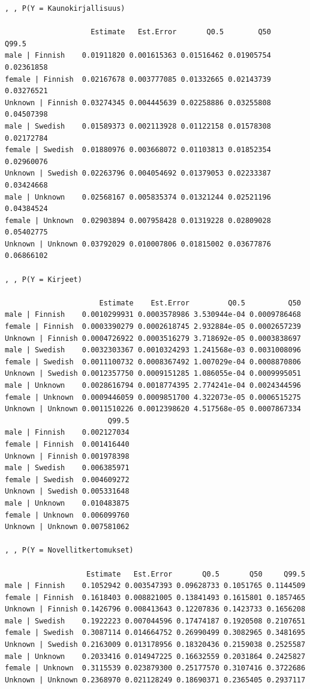 \documentclass[
  letterpaper,
  DIV=11,
  numbers=noendperiod]{scrartcl}
\begin{document}
\begin{verbatim}
, , P(Y = Kaunokirjallisuus)

                    Estimate   Est.Error       Q0.5        Q50      Q99.5
male | Finnish    0.01911820 0.001615363 0.01516462 0.01905754 0.02361858
female | Finnish  0.02167678 0.003777085 0.01332665 0.02143739 0.03276521
Unknown | Finnish 0.03274345 0.004445639 0.02258886 0.03255808 0.04507398
male | Swedish    0.01589373 0.002113928 0.01122158 0.01578308 0.02172784
female | Swedish  0.01880976 0.003668072 0.01103813 0.01852354 0.02960076
Unknown | Swedish 0.02263796 0.004054692 0.01379053 0.02233387 0.03424668
male | Unknown    0.02568167 0.005835374 0.01321244 0.02521196 0.04384524
female | Unknown  0.02903894 0.007958428 0.01319228 0.02809028 0.05402775
Unknown | Unknown 0.03792029 0.010007806 0.01815002 0.03677876 0.06866102

, , P(Y = Kirjeet)

                      Estimate    Est.Error         Q0.5          Q50
male | Finnish    0.0010299931 0.0003578986 3.530944e-04 0.0009786468
female | Finnish  0.0003390279 0.0002618745 2.932884e-05 0.0002657239
Unknown | Finnish 0.0004726922 0.0003516279 3.718692e-05 0.0003838697
male | Swedish    0.0032303367 0.0010324293 1.241568e-03 0.0031008096
female | Swedish  0.0011100732 0.0008367492 1.007029e-04 0.0008870806
Unknown | Swedish 0.0012357750 0.0009151285 1.086055e-04 0.0009995051
male | Unknown    0.0028616794 0.0018774395 2.774241e-04 0.0024344596
female | Unknown  0.0009446059 0.0009851700 4.322073e-05 0.0006515275
Unknown | Unknown 0.0011510226 0.0012398620 4.517568e-05 0.0007867334
                        Q99.5
male | Finnish    0.002127034
female | Finnish  0.001416440
Unknown | Finnish 0.001978398
male | Swedish    0.006385971
female | Swedish  0.004609272
Unknown | Swedish 0.005331648
male | Unknown    0.010483875
female | Unknown  0.006099760
Unknown | Unknown 0.007581062

, , P(Y = Novellitkertomukset)

                   Estimate   Est.Error       Q0.5       Q50     Q99.5
male | Finnish    0.1052942 0.003547393 0.09628733 0.1051765 0.1144509
female | Finnish  0.1618403 0.008821005 0.13841493 0.1615801 0.1857465
Unknown | Finnish 0.1426796 0.008413643 0.12207836 0.1423733 0.1656208
male | Swedish    0.1922223 0.007044596 0.17474187 0.1920508 0.2107651
female | Swedish  0.3087114 0.014664752 0.26990499 0.3082965 0.3481695
Unknown | Swedish 0.2163009 0.013178956 0.18320436 0.2159038 0.2525587
male | Unknown    0.2033416 0.014947225 0.16632559 0.2031864 0.2425827
female | Unknown  0.3115539 0.023879300 0.25177570 0.3107416 0.3722686
Unknown | Unknown 0.2368970 0.021128249 0.18690371 0.2365405 0.2937117


\end{verbatim}
\end{document}
